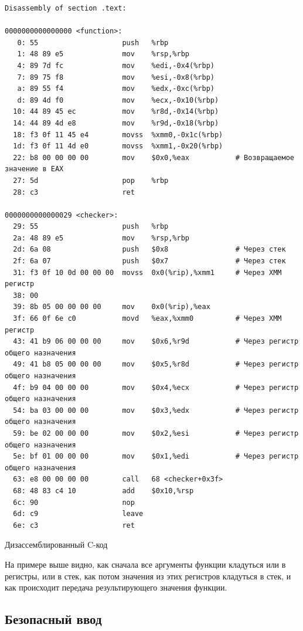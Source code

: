 \documentclass[a4paper]{article}
\begin{document}
  \begin{listing}[H]
    \begin{verbatim}
Disassembly of section .text:

0000000000000000 <function>:
   0: 55                    push   %rbp
   1: 48 89 e5              mov    %rsp,%rbp
   4: 89 7d fc              mov    %edi,-0x4(%rbp)
   7: 89 75 f8              mov    %esi,-0x8(%rbp)
   a: 89 55 f4              mov    %edx,-0xc(%rbp)
   d: 89 4d f0              mov    %ecx,-0x10(%rbp)
  10: 44 89 45 ec           mov    %r8d,-0x14(%rbp)
  14: 44 89 4d e8           mov    %r9d,-0x18(%rbp)
  18: f3 0f 11 45 e4        movss  %xmm0,-0x1c(%rbp)
  1d: f3 0f 11 4d e0        movss  %xmm1,-0x20(%rbp)
  22: b8 00 00 00 00        mov    $0x0,%eax           # Возвращаемое значение в EAX
  27: 5d                    pop    %rbp
  28: c3                    ret

0000000000000029 <checker>:
  29: 55                    push   %rbp
  2a: 48 89 e5              mov    %rsp,%rbp
  2d: 6a 08                 push   $0x8                # Через стек
  2f: 6a 07                 push   $0x7                # Через стек
  31: f3 0f 10 0d 00 00 00  movss  0x0(%rip),%xmm1     # Через XMM регистр
  38: 00 
  39: 8b 05 00 00 00 00     mov    0x0(%rip),%eax
  3f: 66 0f 6e c0           movd   %eax,%xmm0          # Через XMM регистр
  43: 41 b9 06 00 00 00     mov    $0x6,%r9d           # Через регистр общего назначения
  49: 41 b8 05 00 00 00     mov    $0x5,%r8d           # Через регистр общего назначения
  4f: b9 04 00 00 00        mov    $0x4,%ecx           # Через регистр общего назначения
  54: ba 03 00 00 00        mov    $0x3,%edx           # Через регистр общего назначения
  59: be 02 00 00 00        mov    $0x2,%esi           # Через регистр общего назначения
  5e: bf 01 00 00 00        mov    $0x1,%edi           # Через регистр общего назначения
  63: e8 00 00 00 00        call   68 <checker+0x3f>
  68: 48 83 c4 10           add    $0x10,%rsp
  6c: 90                    nop
  6d: c9                    leave
  6e: c3                    ret
    \end{verbatim}
    \caption{Дизассемблированный C-код}
  \end{listing}

  На примере выше видно, как сначала все аргументы функции кладуться
  или в регистры, или в стек, как потом значения из этих регистров кладуться
  в стек, и как происходит передача результирующего значения функции.

  \subsection{Безопасный ввод}
\end{document}
